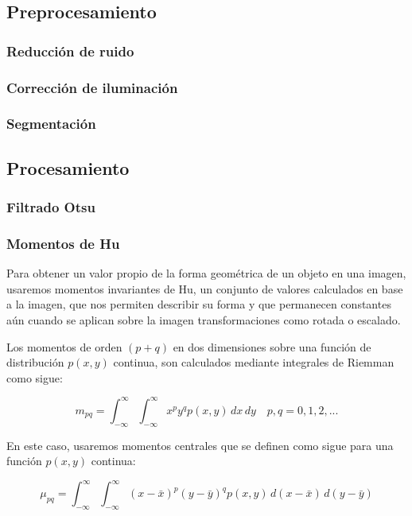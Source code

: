 \documentclass[letter]{article}
\begin{document}
\subsection{Preprocesamiento}
\label{sec:orgfb6320a}

\subsubsection{Reducción de ruido}
\label{sec:org8768d65}
\subsubsection{Corrección de iluminación}
\label{sec:org43736fd}

\subsubsection{Segmentación}
\label{sec:org270537e}

\subsection{Procesamiento}
\label{sec:orgad6744a}
\subsubsection{Filtrado Otsu}
\label{sec:org25cc384}
\subsubsection{Momentos de Hu}
\label{sec:orgb0f3871}
Para obtener un valor propio de la forma geométrica de un objeto en una imagen,
usaremos momentos invariantes de Hu, un conjunto de valores calculados en base a
la imagen, que nos permiten describir su forma y que permanecen constantes aún
cuando se aplican sobre la imagen transformaciones como rotada o escalado.

Los momentos de orden \((p+q)\) en dos dimensiones sobre una función de
distribución \(p(x, y)\) continua, son calculados mediante integrales de Riemman
como sigue:

$$
m_{pq} =  \int_{-\infty}^{\infty} \int_{-\infty}^{\infty} x^p y^q p(x, y)\,dx\,dy \quad p, q = 0, 1, 2, ...
$$

En este caso, usaremos momentos centrales que se definen como sigue para una
función \(p(x, y)\) continua:

$$ \mu_{pq} = \int_{-\infty}^{\infty} \int_{-\infty}^{\infty} (x-\bar x)^p (y-\bar y)^q p(x, y)\, d(x-\bar x)\,d(y-\bar y) $$
\end{document}
